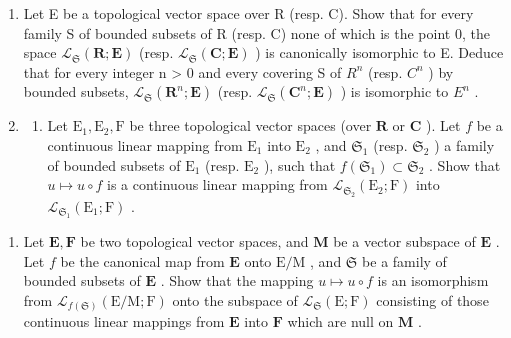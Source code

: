 \begin{enumerate}
\def\labelenumi{\arabic{enumi})}
\setcounter{enumi}{2}
\item
  Let E be a topological vector space over R (resp. C). Show that for every family S of bounded subsets of R (resp. C) none of which is the point 0, the space \(\mathcal{L}_{\mathfrak{S}}(\mathbf{R};\mathbf{E})\) (resp. \(\mathcal{L}_{\mathfrak{S}}(\mathbf{C};\mathbf{E})\) ) is canonically isomorphic to E. Deduce that for every integer n \textgreater{} 0 and every covering S of \(R^{n}\) (resp. \(C^{n}\) ) by bounded subsets, \(\mathcal{L}_{\mathfrak{S}}(\mathbf{R}^{n};\mathbf{E})\) (resp. \(\mathcal{L}_{\mathfrak{S}}(\mathbf{C}^{n};\mathbf{E})\) ) is isomorphic to \(E^{n}\) .
\item
  \begin{enumerate}
  \def\labelenumii{\alph{enumii})}
  \tightlist
  \item
    Let \(\mathrm{E}_1, \mathrm{E}_2, \mathrm{F}\) be three topological vector spaces (over \(\mathbf{R}\) or \(\mathbf{C}\) ). Let \(f\) be a continuous linear mapping from \(\mathrm{E}_1\) into \(\mathrm{E}_2\) , and \(\mathfrak{S}_1\) (resp. \(\mathfrak{S}_2\) ) a family of bounded subsets of \(\mathrm{E}_1\) (resp. \(\mathrm{E}_2\) ), such that \(f(\mathfrak{S}_1) \subset \mathfrak{S}_2\) . Show that \(u \mapsto u \circ f\) is a continuous linear mapping from \(\mathcal{L}_{\mathfrak{S}_2}(\mathrm{E}_2; \mathrm{F})\) into \(\mathcal{L}_{\mathfrak{S}_1}(\mathrm{E}_1; \mathrm{F})\) .
  \end{enumerate}
\end{enumerate}

\begin{enumerate}
\def\labelenumi{\alph{enumi})}
\setcounter{enumi}{1}
\tightlist
\item
  Let \(\mathbf{E},\mathbf{F}\) be two topological vector spaces, and \(\mathbf{M}\) be a vector subspace of \(\mathbf{E}\) . Let \(f\) be the canonical map from \(\mathbf{E}\) onto \(\mathrm{E / M}\) , and \(\mathfrak{S}\) be a family of bounded subsets of \(\mathbf{E}\) . Show that the mapping \(u\mapsto u\circ f\) is an isomorphism from \(\mathcal{L}_{f(\mathfrak{S})}(\mathrm{E / M};\mathrm{F})\) onto the subspace of \(\mathcal{L}_{\mathfrak{S}}(\mathrm{E};\mathrm{F})\) consisting of those continuous linear mappings from \(\mathbf{E}\) into \(\mathbf{F}\) which are null on \(\mathbf{M}\) .
\end{enumerate}

